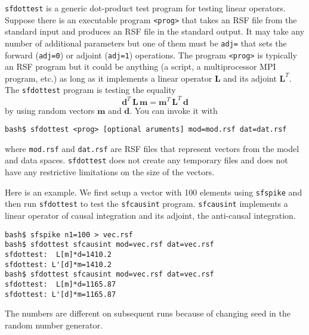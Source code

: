 \texttt{sfdottest} is a generic dot-product test program for testing
linear operators. Suppose there is an executable program
\texttt{<prog>} that takes an RSF file from the standard input and
produces an RSF file in the standard output. It may take any number of
additional parameters but one of them must be \texttt{adj=} that sets
the forward (\texttt{adj=0}) or adjoint (\texttt{adj=1}) operations.
The program \texttt{<prog>} is typically an RSF program but it could
be anything (a script, a multiprocessor MPI program, etc.) as long as
it implements a linear operator $\mathbf{L}$ and its adjoint
$\mathbf{L}^T$. The \texttt{sfdottest} program is testing the equality
\begin{equation}
\label{eq:dptest}
\mathbf{d}^T\,\mathbf{L}\,\mathbf{m} = \mathbf{m}^T\,\mathbf{L}^T\,\mathbf{d}
\end{equation}
by using random vectors $\mathbf{m}$ and $\mathbf{d}$. You can invoke it with
\begin{verbatim}
bash$ sfdottest <prog> [optional aruments] mod=mod.rsf dat=dat.rsf
\end{verbatim}
where \texttt{mod.rsf} and \texttt{dat.rsf} are RSF files that
represent vectors from the model and data spaces. \texttt{sfdottest}
does not create any temporary files and does not have any restrictive
limitations on the size of the vectors.

Here is an example. We first setup a vector with 100 elements using
\texttt{sfspike} and then run \texttt{sfdottest} to test the
\texttt{sfcausint} program. \texttt{sfcausint} implements a linear
operator of causal integration and its adjoint, the anti-causal
integration.
\begin{verbatim}
bash$ sfspike n1=100 > vec.rsf
bash$ sfdottest sfcausint mod=vec.rsf dat=vec.rsf
sfdottest:  L[m]*d=1410.2
sfdottest: L'[d]*m=1410.2
bash$ sfdottest sfcausint mod=vec.rsf dat=vec.rsf
sfdottest:  L[m]*d=1165.87
sfdottest: L'[d]*m=1165.87
\end{verbatim}
The numbers are different on subsequent runs because of changing
seed in the random number generator.

